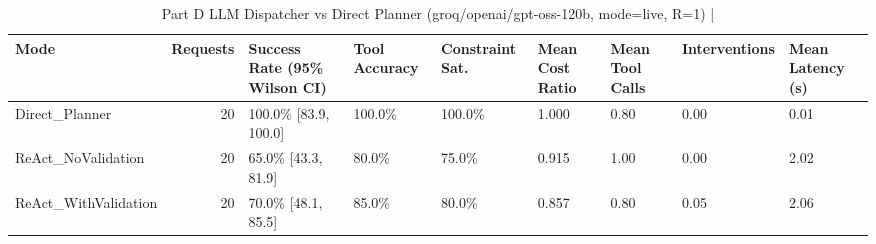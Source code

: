 \begin{table}[htbp]
\centering
\caption{Part D LLM Dispatcher vs Direct Planner (groq/openai/gpt-oss-120b, mode=live, R=1) | \stampline}
\label{tab:partD_llm_summary}
\begin{tabular}{lrlllllll}
\toprule
Mode & Requests & Success Rate (95\% Wilson CI) & Tool Accuracy & Constraint Sat. & Mean Cost Ratio & Mean Tool Calls & Interventions & Mean Latency (s) \\
\midrule
Direct\_Planner & 20 & 100.0\% [83.9, 100.0] & 100.0\% & 100.0\% & 1.000 & 0.80 & 0.00 & 0.01 \\
ReAct\_NoValidation & 20 & 65.0\% [43.3, 81.9] & 80.0\% & 75.0\% & 0.915 & 1.00 & 0.00 & 2.02 \\
ReAct\_WithValidation & 20 & 70.0\% [48.1, 85.5] & 85.0\% & 80.0\% & 0.857 & 0.80 & 0.05 & 2.06 \\
\bottomrule
\end{tabular}

\end{table}

